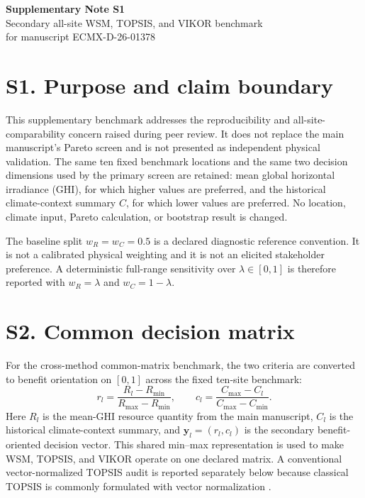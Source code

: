 \documentclass[11pt]{article}
\begin{document}
\begin{center}
{\Large\bfseries Supplementary Note S1}\\[0.35em]
{\large Secondary all-site WSM, TOPSIS, and VIKOR benchmark}\\[0.35em]
for manuscript ECMX-D-26-01378
\end{center}

\section*{S1. Purpose and claim boundary}
This supplementary benchmark addresses the reproducibility and all-site-comparability concern raised during peer review. It does not replace the main manuscript's Pareto screen and is not presented as independent physical validation. The same ten fixed benchmark locations and the same two decision dimensions used by the primary screen are retained: mean global horizontal irradiance (GHI), for which higher values are preferred, and the historical climate-context summary $C$, for which lower values are preferred. No location, climate input, Pareto calculation, or bootstrap result is changed.

The baseline split $w_R=w_C=0.5$ is a declared diagnostic reference convention. It is not a calibrated physical weighting and it is not an elicited stakeholder preference. A deterministic full-range sensitivity over $\lambda\in[0,1]$ is therefore reported with $w_R=\lambda$ and $w_C=1-\lambda$.

\section*{S2. Common decision matrix}
For the cross-method common-matrix benchmark, the two criteria are converted to benefit orientation on $[0,1]$ across the fixed ten-site benchmark:
\begin{equation}
r_l=\frac{R_l-R_{\min}}{R_{\max}-R_{\min}},\qquad
c_l=\frac{C_{\max}-C_l}{C_{\max}-C_{\min}}.
\end{equation}
Here $R_l$ is the mean-GHI resource quantity from the main manuscript, $C_l$ is the historical climate-context summary, and $\mathbf{y}_l=(r_l,c_l)$ is the secondary benefit-oriented decision vector. This shared min--max representation is used to make WSM, TOPSIS, and VIKOR operate on one declared matrix. A conventional vector-normalized TOPSIS audit is reported separately below because classical TOPSIS is commonly formulated with vector normalization \cite{hwang1981,opricovic2004}.
\end{document}
